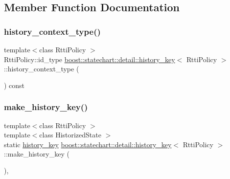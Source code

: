 \subsection{Member Function Documentation}
\mbox{\label{classboost_1_1statechart_1_1detail_1_1history__key_ad33ebdbbfa0830db8b63f16364254937}} 
\subsubsection{\texorpdfstring{history\+\_\+context\+\_\+type()}{history\_context\_type()}}
{\footnotesize\ttfamily template$<$class Rtti\+Policy $>$ \\
Rtti\+Policy\+::id\+\_\+type \mbox{\hyperlink{classboost_1_1statechart_1_1detail_1_1history__key}{boost\+::statechart\+::detail\+::history\+\_\+key}}$<$ Rtti\+Policy $>$\+::history\+\_\+context\+\_\+type (\begin{DoxyParamCaption}{ }\end{DoxyParamCaption}) const\hspace{0.3cm}{\ttfamily [inline]}}

\mbox{\label{classboost_1_1statechart_1_1detail_1_1history__key_aefbb3ffada8c42f5c5f5a9e464341452}} 
\subsubsection{\texorpdfstring{make\+\_\+history\+\_\+key()}{make\_history\_key()}}
{\footnotesize\ttfamily template$<$class Rtti\+Policy $>$ \\
template$<$class Historized\+State $>$ \\
static \mbox{\hyperlink{classboost_1_1statechart_1_1detail_1_1history__key}{history\+\_\+key}} \mbox{\hyperlink{classboost_1_1statechart_1_1detail_1_1history__key}{boost\+::statechart\+::detail\+::history\+\_\+key}}$<$ Rtti\+Policy $>$\+::make\+\_\+history\+\_\+key (\begin{DoxyParamCaption}{ }\end{DoxyParamCaption})\hspace{0.3cm}{\ttfamily [inline]}, {\ttfamily [static]}}

